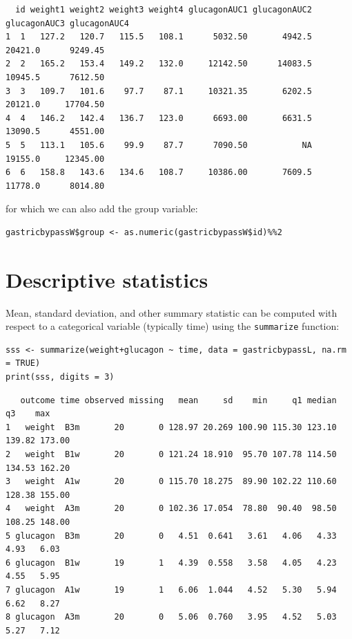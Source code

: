 \documentclass[12pt]{article}
\begin{document}
\begin{verbatim}
  id weight1 weight2 weight3 weight4 glucagonAUC1 glucagonAUC2 glucagonAUC3 glucagonAUC4
1  1   127.2   120.7   115.5   108.1      5032.50       4942.5      20421.0      9249.45
2  2   165.2   153.4   149.2   132.0     12142.50      14083.5      10945.5      7612.50
3  3   109.7   101.6    97.7    87.1     10321.35       6202.5      20121.0     17704.50
4  4   146.2   142.4   136.7   123.0      6693.00       6631.5      13090.5      4551.00
5  5   113.1   105.6    99.9    87.7      7090.50           NA      19155.0     12345.00
6  6   158.8   143.6   134.6   108.7     10386.00       7609.5      11778.0      8014.80
\end{verbatim}


for which we can also add the group variable:
\lstset{language=r,label= ,caption= ,captionpos=b,numbers=none}
\begin{lstlisting}
gastricbypassW$group <- as.numeric(gastricbypassW$id)%%2
\end{lstlisting}

\clearpage

\section{Descriptive statistics}
\label{sec:org5a07f91}
Mean, standard deviation, and other summary statistic can be computed
with respect to a categorical variable (typically time) using the
\texttt{summarize} function:
\lstset{language=r,label= ,caption= ,captionpos=b,numbers=none}
\begin{lstlisting}
sss <- summarize(weight+glucagon ~ time, data = gastricbypassL, na.rm = TRUE)
print(sss, digits = 3)
\end{lstlisting}

\begin{verbatim}
   outcome time observed missing   mean     sd    min     q1 median     q3    max
1   weight  B3m       20       0 128.97 20.269 100.90 115.30 123.10 139.82 173.00
2   weight  B1w       20       0 121.24 18.910  95.70 107.78 114.50 134.53 162.20
3   weight  A1w       20       0 115.70 18.275  89.90 102.22 110.60 128.38 155.00
4   weight  A3m       20       0 102.36 17.054  78.80  90.40  98.50 108.25 148.00
5 glucagon  B3m       20       0   4.51  0.641   3.61   4.06   4.33   4.93   6.03
6 glucagon  B1w       19       1   4.39  0.558   3.58   4.05   4.23   4.55   5.95
7 glucagon  A1w       19       1   6.06  1.044   4.52   5.30   5.94   6.62   8.27
8 glucagon  A3m       20       0   5.06  0.760   3.95   4.52   5.03   5.27   7.12
\end{verbatim}
\end{document}
